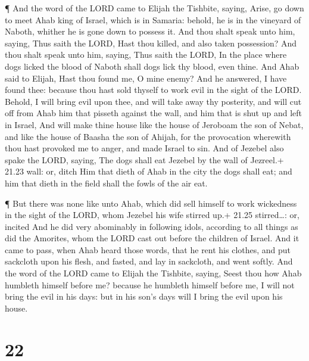  ¶ And the word of the LORD came to Elijah the Tishbite,
saying,  Arise, go down to meet Ahab king of Israel, which
is in Samaria: behold, he is in the vineyard of Naboth, whither he is
gone down to possess it.  And thou shalt speak unto him,
saying, Thus saith the LORD, Hast thou killed, and also taken
possession? And thou shalt speak unto him, saying, Thus saith the LORD,
In the place where dogs licked the blood of Naboth shall dogs lick thy
blood, even thine.  And Ahab said to Elijah, Hast thou
found me, O mine enemy? And he answered, I have found thee: because thou
hast sold thyself to work evil in the sight of the LORD. 
Behold, I will bring evil upon thee, and will take away thy posterity,
and will cut off from Ahab him that pisseth against the wall, and him
that is shut up and left in Israel,  And will make thine
house like the house of Jeroboam the son of Nebat, and like the house of
Baasha the son of Ahijah, for the provocation wherewith thou hast
provoked me to anger, and made Israel to sin.  And of
Jezebel also spake the LORD, saying, The dogs shall eat Jezebel by the
wall of Jezreel.+ 21.23 wall: or, ditch  Him that dieth of
Ahab in the city the dogs shall eat; and him that dieth in the field
shall the fowls of the air eat.

 ¶ But there was none like unto Ahab, which did sell
himself to work wickedness in the sight of the LORD, whom Jezebel his
wife stirred up.+ 21.25 stirred\ldots: or, incited  And he
did very abominably in following idols, according to all things as did
the Amorites, whom the LORD cast out before the children of Israel.
 And it came to pass, when Ahab heard those words, that he
rent his clothes, and put sackcloth upon his flesh, and fasted, and lay
in sackcloth, and went softly.  And the word of the LORD
came to Elijah the Tishbite, saying,  Seest thou how Ahab
humbleth himself before me? because he humbleth himself before me, I
will not bring the evil in his days: but in his son's days will I bring
the evil upon his house.

\hypertarget{section-21}{%
\section{22}\label{section-21}}

